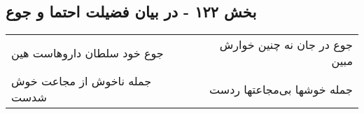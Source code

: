 \begin{center}
\section*{بخش ۱۲۲ - در بیان فضیلت احتما و جوع}
\label{sec:sh122}
\begin{longtable}{l p{0.5cm} r}
جوع خود سلطان داروهاست هین
&&
جوع در جان نه چنین خوارش مبین
\\
جمله ناخوش از مجاعت خوش شدست
&&
جمله خوشها بی‌مجاعتها ردست
\\
\end{longtable}
\end{center}
